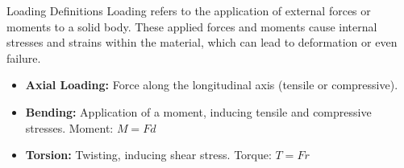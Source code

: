 \documentclass[aspectratio=169,11pt]{beamer}
\begin{document}
\begin{frame}{Loading Definitions}
Loading refers to the application of external forces or moments to a solid body. These applied forces and moments cause internal stresses and strains within the material, which can lead to deformation or even failure.
  \begin{itemize}
    \item \textbf{Axial Loading:} Force along the longitudinal axis (tensile or compressive).
    \item \textbf{Bending:} Application of a moment, inducing tensile and compressive stresses. Moment: $M=Fd$
    \item \textbf{Torsion:} Twisting, inducing shear stress. Torque: $T=Fr$
  \end{itemize}
\end{frame}
\end{document}
